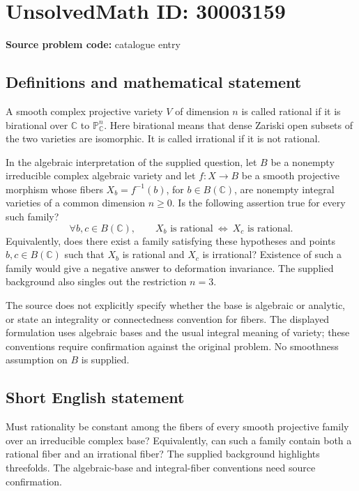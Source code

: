 \documentclass[11pt]{article}
\newcommand{\C}{\mathbb{C}}
\newcommand{\PP}{\mathbb{P}}
\begin{document}
\section*{UnsolvedMath ID: 30003159}
\textbf{Source problem code:} catalogue entry
\subsection{Definitions and mathematical statement}
A smooth complex projective variety \(V\) of dimension \(n\) is called rational if it is birational over \(\C\) to \(\PP^n_{\C}\). Here birational means that dense Zariski open subsets of the two varieties are isomorphic. It is called irrational if it is not rational.

In the algebraic interpretation of the supplied question, let \(B\) be a nonempty irreducible complex algebraic variety and let \(f\colon X\to B\) be a smooth projective morphism whose fibers \(X_b=f^{-1}(b)\), for \(b\in B(\C)\), are nonempty integral varieties of a common dimension \(n\geq 0\). Is the following assertion true for every such family?
\[
\forall b,c\in B(\C),\qquad
X_b\text{ is rational}\ \Longleftrightarrow\ X_c\text{ is rational}.
\]
Equivalently, does there exist a family satisfying these hypotheses and points \(b,c\in B(\C)\) such that \(X_b\) is rational and \(X_c\) is irrational? Existence of such a family would give a negative answer to deformation invariance. The supplied background also singles out the restriction \(n=3\).

The source does not explicitly specify whether the base is algebraic or analytic, or state an integrality or connectedness convention for fibers. The displayed formulation uses algebraic bases and the usual integral meaning of variety; these conventions require confirmation against the original problem. No smoothness assumption on \(B\) is supplied.
\subsection{Short English statement}
Must rationality be constant among the fibers of every smooth projective family over an irreducible complex base? Equivalently, can such a family contain both a rational fiber and an irrational fiber? The supplied background highlights threefolds. The algebraic-base and integral-fiber conventions need source confirmation.
\end{document}
